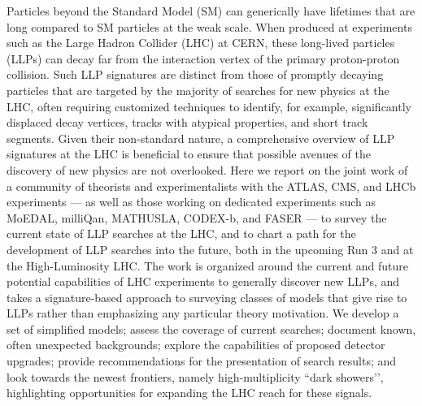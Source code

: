 Particles beyond the Standard Model (SM) can generically have lifetimes that are long compared to SM particles at the weak scale.
When produced at experiments such as the Large Hadron Collider (LHC) at CERN, these long-lived particles (LLPs) can decay far from the interaction vertex of the primary proton-proton collision.
Such LLP signatures are distinct from those of promptly decaying particles that are targeted by the majority of searches for new physics at the LHC, often requiring customized techniques to identify, for example, significantly displaced decay vertices, tracks with atypical properties, and short track segments.
Given their non-standard nature, a comprehensive overview of LLP signatures at the LHC is beneficial to ensure that possible avenues of the discovery of new physics are not overlooked.
Here we report on the joint work of a community of theorists and experimentalists with the ATLAS, CMS, and LHCb experiments --- as well as those working on dedicated experiments such as MoEDAL, milliQan, MATHUSLA, CODEX-b, and FASER --- to survey the current state of LLP searches at the LHC, and to chart a path for the development of LLP searches into the future, both in the upcoming Run 3 and at the High-Luminosity LHC.
The work is organized around the current and future potential capabilities of LHC experiments to generally discover new LLPs, and takes a signature-based approach to surveying classes of models that give rise to LLPs rather than emphasizing any particular theory motivation.
We develop a set of simplified models; assess the coverage of current searches; document known, often unexpected backgrounds; explore the capabilities of proposed detector upgrades; provide recommendations for the presentation of search results; and look towards the newest frontiers, namely high-multiplicity ``dark showers’', highlighting opportunities for expanding the LHC reach for these signals.
